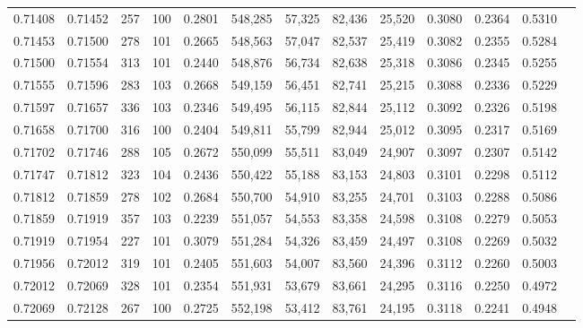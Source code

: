 \begin{tabular}{rrrrrrrrrrrrr}
0.71408 & 0.71452 &   257 & 100 &                                     0.2801 & 548,285 &  57,325 &  82,436 &  25,520 & 0.3080 & 0.2364 & 0.5310 \\
0.71453 & 0.71500 &   278 & 101 &                                     0.2665 & 548,563 &  57,047 &  82,537 &  25,419 & 0.3082 & 0.2355 & 0.5284 \\
0.71500 & 0.71554 &   313 & 101 &                                     0.2440 & 548,876 &  56,734 &  82,638 &  25,318 & 0.3086 & 0.2345 & 0.5255 \\
0.71555 & 0.71596 &   283 & 103 &                                     0.2668 & 549,159 &  56,451 &  82,741 &  25,215 & 0.3088 & 0.2336 & 0.5229 \\
0.71597 & 0.71657 &   336 & 103 &                                     0.2346 & 549,495 &  56,115 &  82,844 &  25,112 & 0.3092 & 0.2326 & 0.5198 \\
0.71658 & 0.71700 &   316 & 100 &                                     0.2404 & 549,811 &  55,799 &  82,944 &  25,012 & 0.3095 & 0.2317 & 0.5169 \\
0.71702 & 0.71746 &   288 & 105 &                                     0.2672 & 550,099 &  55,511 &  83,049 &  24,907 & 0.3097 & 0.2307 & 0.5142 \\
0.71747 & 0.71812 &   323 & 104 &                                     0.2436 & 550,422 &  55,188 &  83,153 &  24,803 & 0.3101 & 0.2298 & 0.5112 \\
0.71812 & 0.71859 &   278 & 102 &                                     0.2684 & 550,700 &  54,910 &  83,255 &  24,701 & 0.3103 & 0.2288 & 0.5086 \\
0.71859 & 0.71919 &   357 & 103 &                                     0.2239 & 551,057 &  54,553 &  83,358 &  24,598 & 0.3108 & 0.2279 & 0.5053 \\
0.71919 & 0.71954 &   227 & 101 &                                     0.3079 & 551,284 &  54,326 &  83,459 &  24,497 & 0.3108 & 0.2269 & 0.5032 \\
0.71956 & 0.72012 &   319 & 101 &                                     0.2405 & 551,603 &  54,007 &  83,560 &  24,396 & 0.3112 & 0.2260 & 0.5003 \\
0.72012 & 0.72069 &   328 & 101 &                                     0.2354 & 551,931 &  53,679 &  83,661 &  24,295 & 0.3116 & 0.2250 & 0.4972 \\
0.72069 & 0.72128 &   267 & 100 &                                     0.2725 & 552,198 &  53,412 &  83,761 &  24,195 & 0.3118 & 0.2241 & 0.4948 \\

\end{tabular}
